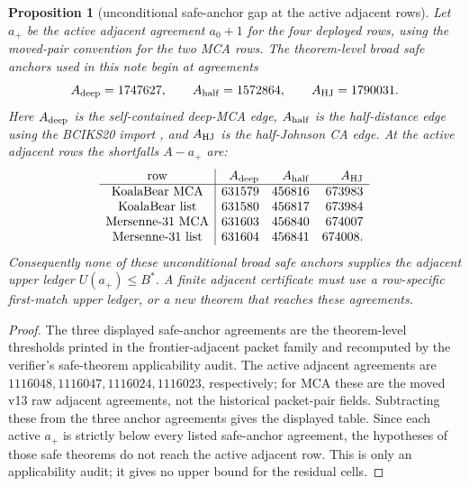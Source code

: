 \documentclass[a4paper,11pt]{amsart}
\newtheorem{proposition}[theorem]{Proposition}
\theoremstyle{remark}
\begin{document}
\begin{proposition}[unconditional safe-anchor gap at the active adjacent rows]\label{prop:finite-safe-anchor-gap}
Let \(a_+\) be the active adjacent agreement \(a_0+1\) for the four deployed rows, using the moved-pair convention for the two MCA rows.  The theorem-level broad safe anchors used in this note begin at agreements
\[
        A_{\rm deep}=1747627,\qquad
        A_{\rm half}=1572864,\qquad
        A_{\rm HJ}=1790031.
\]
Here \(A_{\rm deep}\) is the self-contained deep-MCA edge, \(A_{\rm half}\) is the half-distance edge using the BCIKS20 import \cite{BCIKS20}, and \(A_{\rm HJ}\) is the half-Johnson CA edge.  At the active adjacent rows the shortfalls \(A-a_+\) are:
\[
\begin{array}{c|rrr}
\text{row} & A_{\rm deep} & A_{\rm half} & A_{\rm HJ}\\ \hline
\text{KoalaBear MCA} & 631579 & 456816 & 673983\\
\text{KoalaBear list} & 631580 & 456817 & 673984\\
\text{Mersenne-31 MCA} & 631603 & 456840 & 674007\\
\text{Mersenne-31 list} & 631604 & 456841 & 674008 .
\end{array}
\]
Consequently none of these unconditional broad safe anchors supplies the adjacent upper ledger \(U(a_+)\le B^*\).  A finite adjacent certificate must use a row-specific first-match upper ledger, or a new theorem that reaches these agreements.
\end{proposition}

\begin{proof}
The three displayed safe-anchor agreements are the theorem-level thresholds printed in the frontier-adjacent packet family and recomputed by the verifier's safe-theorem applicability audit.  The active adjacent agreements are \(1116048,1116047,1116024,1116023\), respectively; for MCA these are the moved v13 raw adjacent agreements, not the historical packet-pair fields.  Subtracting these from the three anchor agreements gives the displayed table.  Since each active \(a_+\) is strictly below every listed safe-anchor agreement, the hypotheses of those safe theorems do not reach the active adjacent row.  This is only an applicability audit; it gives no upper bound for the residual cells.
\end{proof}
\end{document}
